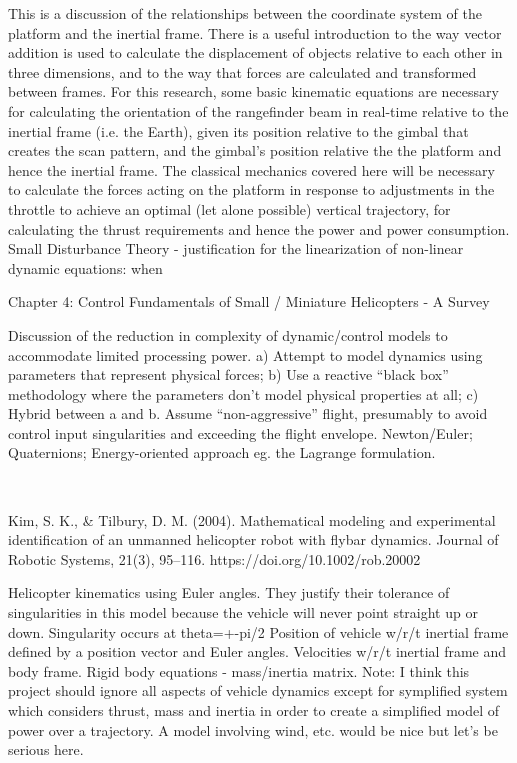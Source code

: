 This is a discussion of the relationships between the coordinate system of the platform and the inertial frame. There is a useful introduction to the way vector addition is used to calculate the displacement of objects relative to each other in three dimensions, and to the way that forces are calculated and transformed between frames. 
For this research, some basic kinematic equations are necessary for calculating the orientation of the rangefinder beam in real-time relative to the inertial frame (i.e. the Earth), given its position relative to the gimbal that creates the scan pattern, and the gimbal’s position relative the the platform and hence the inertial frame. 
The classical mechanics covered here will be necessary to calculate the forces acting on the platform in response to adjustments in the throttle to achieve an optimal (let alone possible) vertical trajectory, for calculating the thrust requirements and hence the power and power consumption.
Small Disturbance Theory - justification for the linearization of non-linear dynamic equations: when 

Chapter 4: Control Fundamentals of Small / Miniature Helicopters - A Survey

Discussion of the reduction in complexity of dynamic/control models to accommodate limited processing power. 
a) Attempt to model dynamics using parameters that represent physical forces; b) Use a reactive “black box” methodology where the parameters don’t model physical properties at all; c) Hybrid between a and b.
Assume “non-aggressive” flight, presumably to avoid control input singularities and exceeding the flight envelope.
Newton/Euler; Quaternions; Energy-oriented approach eg. the Lagrange formulation.

~~~

\cite{Kim2004}
Kim, S. K., \& Tilbury, D. M. (2004). Mathematical modeling and experimental identification of an unmanned helicopter robot with flybar dynamics. Journal of Robotic Systems, 21(3), 95–116. https://doi.org/10.1002/rob.20002

Helicopter kinematics using Euler angles. They justify their tolerance of singularities in this model because the vehicle will never point straight up or down. Singularity occurs at theta=+-pi/2
Position of vehicle w/r/t inertial frame defined by a position vector and Euler angles.
Velocities w/r/t inertial frame and body frame.
Rigid body equations - mass/inertia matrix.
Note: I think this project should ignore all aspects of vehicle dynamics except for symplified system which considers thrust, mass and inertia in order to create a simplified model of power over a trajectory. A model involving wind, etc. would be nice but let’s be serious here.


